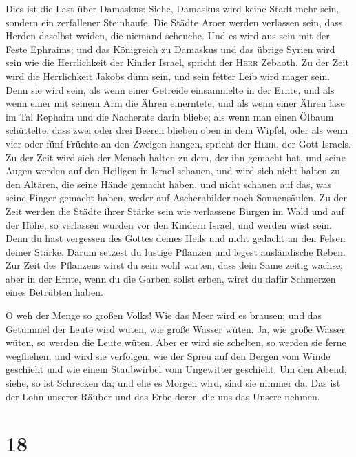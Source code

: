  Dies ist die Last über Damaskus: Siehe, Damaskus wird
keine Stadt mehr sein, sondern ein zerfallener Steinhaufe.
 Die Städte Aroer werden verlassen sein, dass Herden
daselbst weiden, die niemand scheuche.  Und es wird aus
sein mit der Feste Ephraims; und das Königreich zu Damaskus und das
übrige Syrien wird sein wie die Herrlichkeit der Kinder Israel, spricht
der \textsc{Herr} Zebaoth.  Zu der Zeit wird die
Herrlichkeit Jakobs dünn sein, und sein fetter Leib wird mager sein.
 Denn sie wird sein, als wenn einer Getreide einsammelte
in der Ernte, und als wenn einer mit seinem Arm die Ähren einerntete,
und als wenn einer Ähren läse im Tal Rephaim  und die
Nachernte darin bliebe; als wenn man einen Ölbaum schüttelte, dass zwei
oder drei Beeren blieben oben in dem Wipfel, oder als wenn vier oder
fünf Früchte an den Zweigen hangen, spricht der \textsc{Herr}, der Gott
Israels.  Zu der Zeit wird sich der Mensch halten zu dem,
der ihn gemacht hat, und seine Augen werden auf den Heiligen in Israel
schauen,  und wird sich nicht halten zu den Altären, die
seine Hände gemacht haben, und nicht schauen auf das, was seine Finger
gemacht haben, weder auf Ascherabilder noch Sonnensäulen. 
Zu der Zeit werden die Städte ihrer Stärke sein wie verlassene Burgen im
Wald und auf der Höhe, so verlassen wurden vor den Kindern Israel, und
werden wüst sein.  Denn du hast vergessen des Gottes
deines Heils und nicht gedacht an den Felsen deiner Stärke. Darum
setzest du lustige Pflanzen und legest ausländische Reben.
 Zur Zeit des Pflanzens wirst du sein wohl warten, dass
dein Same zeitig wachse; aber in der Ernte, wenn du die Garben sollst
erben, wirst du dafür Schmerzen eines Betrübten haben.

 O weh der Menge so großen Volks! Wie das Meer wird es
brausen; und das Getümmel der Leute wird wüten, wie große Wasser wüten.
 Ja, wie große Wasser wüten, so werden die Leute wüten.
Aber er wird sie schelten, so werden sie ferne wegfliehen, und wird sie
verfolgen, wie der Spreu auf den Bergen vom Winde geschieht und wie
einem Staubwirbel vom Ungewitter geschieht.  Um den
Abend, siehe, so ist Schrecken da; und ehe es Morgen wird, sind sie
nimmer da. Das ist der Lohn unserer Räuber und das Erbe derer, die uns
das Unsere nehmen.

\hypertarget{section-17}{%
\section{18}\label{section-17}}

